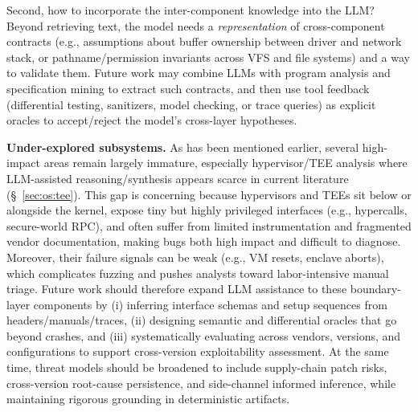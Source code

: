 Second, how to incorporate the inter-component knowledge into the LLM?  
Beyond retrieving text, the model needs a \emph{representation} of cross-component contracts (e.g., assumptions about buffer ownership between driver and network stack, or pathname/permission invariants across VFS and file systems) and a way to validate them.
Future work may combine LLMs with program analysis and specification mining to extract such contracts, and then use tool feedback (differential testing, sanitizers, model checking, or trace queries) as explicit oracles to accept/reject the model's cross-layer hypotheses.



\textbf{Under-explored subsystems.}
As has been mentioned earlier, several high-impact areas remain largely immature, especially hypervisor/TEE analysis where LLM-assisted reasoning/synthesis appears scarce in current literature (\S~\ref{sec:os:tee}). 
This gap is concerning because hypervisors and TEEs sit below or alongside the kernel, expose tiny but highly privileged interfaces (e.g., hypercalls, secure-world RPC), and often suffer from limited instrumentation and fragmented vendor documentation, making bugs both high impact and difficult to diagnose.
Moreover, their failure signals can be weak (e.g., VM resets, enclave aborts), which complicates fuzzing and pushes analysts toward labor-intensive manual triage.
Future work should therefore expand LLM assistance to these boundary-layer components by (i) inferring interface schemas and setup sequences from headers/manuals/traces, (ii) designing semantic and differential oracles that go beyond crashes, and (iii) systematically evaluating across vendors, versions, and configurations to support cross-version exploitability assessment.
At the same time, threat models should be broadened to include supply-chain patch risks, cross-version root-cause persistence, and side-channel informed inference, while maintaining rigorous grounding in deterministic artifacts.

